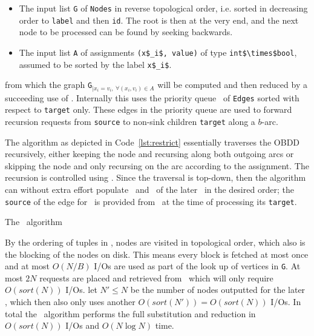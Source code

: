 \begin{itemize}
\item The input list \lstinline{G} of \lstinline{Nodes} in reverse topological
  order, i.e. sorted in decreasing order to \lstinline{label} and then
  \lstinline{id}. The root is then at the very end, and the next node to be
  processed can be found by seeking backwards.

\item The input list \lstinline{A} of assignments \lstinline{(x$_i$, value)} of
  type \lstinline{int$\times$bool}, assumed to be sorted by the label
  \lstinline{x$_i$}.
\end{itemize}
from which the graph \lstinline{G}$_{| x_i = v_i ,\ \forall (x_i,v_i) \in A}$
will be computed and then reduced by a succeeding use of \Reduce. Internally
this uses the priority queue \RestrictQrec\ of \lstinline{Edges} sorted with
respect to \lstinline{target} only. These edges in the priority queue are used
to forward recursion requests from \lstinline{source} to non-sink children
\lstinline{target} along a $b$-arc.

The algorithm as depicted in Code~\ref{lst:restrict} essentially traverses the
OBDD recursively, either keeping the node and recursing along both outgoing arcs
or skipping the node and only recursing on the arc according to the assignment.
The recursion is controlled using \RestrictQrec. Since the traversal is
top-down, then the algorithm can without extra effort populate \ReduceLforward\
and \ReduceQdep\ of the later \Reduce\ in the desired order; the
\lstinline{source} of the edge for \ReduceLforward\ is provided from
\RestrictQrec\ at the time of processing its \lstinline{target}.

\begin{lstfloat}
  \centering

  

  \caption{The \Restrict\ algorithm}
  \label{lst:restrict}
\end{lstfloat}

By the ordering of tuples in \RestrictQrec, nodes are visited in topological
order, which also is the blocking of the nodes on disk. This means every block
is fetched at most once and at most $O(N/B)$ I/Os are used as part of the look
up of vertices in \lstinline{G}. At most $2N$ requests are placed and retrieved
from \Q\ which will only require $O(sort(N))$ I/Os. let $N' \leq N$ be the
number of nodes outputted for the later \Reduce, which then also only uses
another $O(sort(N')) = O(sort(N))$ I/Os. In total the \Restrict\ algorithm
performs the full substitution and reduction in $O(sort(N))$ I/Os and $O(N \log
N)$ time.

